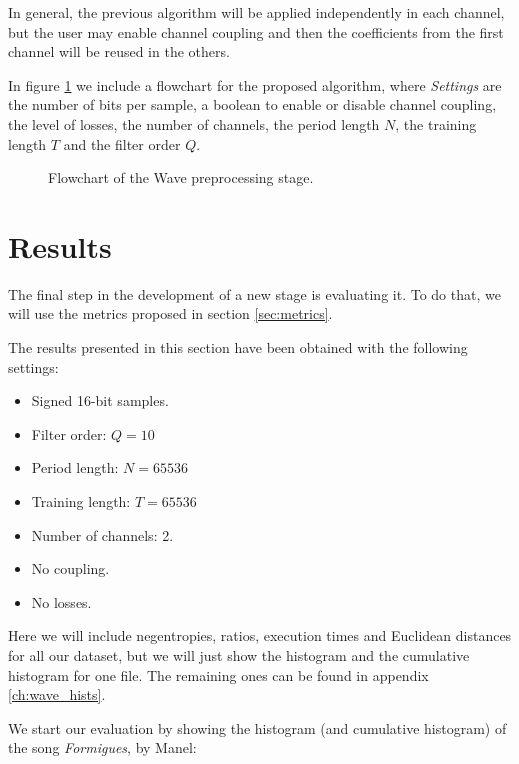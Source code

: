 In general, the previous algorithm will be applied independently in each channel, but the user may enable channel coupling and then the coefficients from the first channel will be reused in the others.

In figure \ref{fig:wave_flowchart} we include a flowchart for the proposed algorithm, where \textit{Settings} are the number of bits per sample, a boolean to enable or disable channel coupling, the level of losses, the number of channels, the period length $N$, the training length $T$ and the filter order $Q$.

\begin{figure}[h!]
	\begin{center}
		\scalebox{.71}{}
	\end{center}
	\caption{Flowchart of the Wave preprocessing stage.}
	\label{fig:wave_flowchart}
\end{figure}

\section{Results}
The final step in the development of a new stage is evaluating it. To do that, we will use the metrics proposed in section \ref{sec:metrics}.

The results presented in this section have been obtained with the following settings:
\begin{itemize}
	\item Signed 16-bit samples.
	\item Filter order: $Q = 10$
	\item Period length: $N = 65536$
	\item Training length: $T = 65536$
	\item Number of channels: 2.
	\item No coupling.
	\item No losses.
\end{itemize}

Here we will include negentropies, ratios, execution times and Euclidean distances for all our dataset, but we will just show the histogram and the cumulative histogram for one file. The remaining ones can be found in appendix \ref{ch:wave_hists}.

We start our evaluation by showing the histogram (and cumulative histogram) of the song \textit{Formigues}, by Manel:

